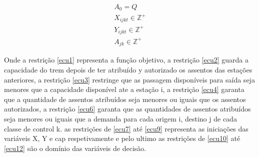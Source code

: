 \documentclass[10pt,a4paper]{article}
\begin{document}
\begin{align}
	 & A_{0} = Q                                                                                                                      \label{ecu9}                           & \\
	 & X_{ijkt} \in \mathbb{Z}^+                                                                                                   \label{ecu10}                              & \\
	 & Y_{ijkt} \in \mathbb{Z}^+                                                                                                   \label{ecu11}                              & \\
	 & A_{jk} \in \mathbb{Z}^+                                                                                                   \label{ecu12}
\end{align}

Onde a restrição \ref{ecu1} representa a função objetivo, a restrição \ref{ecu2} guarda a capacidade do trem depois
de ter atribuído y autorizado os assentos das estações anteriores, a restrição \ref{ecu3} restringe que as passagem disponíveis para
saída seja menores que a capacidade disponível ate a estação i, a restrição \ref{ecu4} garanta que a quantidade de assentos atribuídos
seja menores ou iguais que os assentos autorizados, a restrição \ref{ecu6} garanta que as quantidades de assentos atribuídos seja menores
ou iguais que a demanda para cada origem i, destino j de cada classe de control k. as restrições de \ref{ecu7} até \ref{ecu9} representa
as iniciações das variáveis X, Y e cap respetivamente e pelo ultimo as restrições de \ref{ecu10} até \ref{ecu12} são o domínio das variáveis de decisão.
\\ \\
\end{document}
